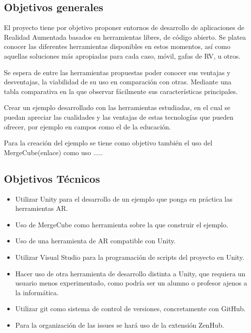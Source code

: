 
\subsection{Objetivos generales}
El proyecto tiene por objetivo proponer entornos de desarrollo de aplicaciones de Realidad Aumentada basados en herramientas libres, de código abierto. Se platea conocer las diferentes herramientas disponibles en estos momentos, así como aquellas soluciones más apropiadas para cada caso, móvil, gafas de RV, u otros.

Se espera de entre las herramientas propuestas poder conocer sus ventajas y desventajas, la viabilidad de su uso en comparación con otras. Mediante una tabla comparativa en la que observar fácilmente sus características principales.

Crear un ejemplo desarrollado con las herramientas estudiadas, en el cual se puedan apreciar las cualidades y las ventajas de estas tecnologías que pueden ofrecer, por ejemplo en campos como el de la educación.

Para la creación del ejemplo se tiene como objetivo también el uso del MergeCube(enlace) como uso .....

\subsection{Objetivos Técnicos}
\begin{itemize}
\item Utilizar Unity para el desarrollo de un ejemplo que ponga en práctica las herramientas AR.
\item Uso de MergeCube como herramienta sobre la que construir el ejemplo.
\item Uso de una herramienta de AR compatible con Unity.
\item Utilizar Visual Studio para la programación de scripts del proyecto en Unity.
\item Hacer uso de otra herramienta de desarrollo distinta a Unity, que requiera un usuario menos experimentado, como podría ser un alumno o profesor ajenos a la informática.
\item Utilizar git como sistema de control de versiones, concretamente con GitHub.
\item Para la organización de las issues  se hará uso de la extensión ZenHub.

	
\end{itemize}

